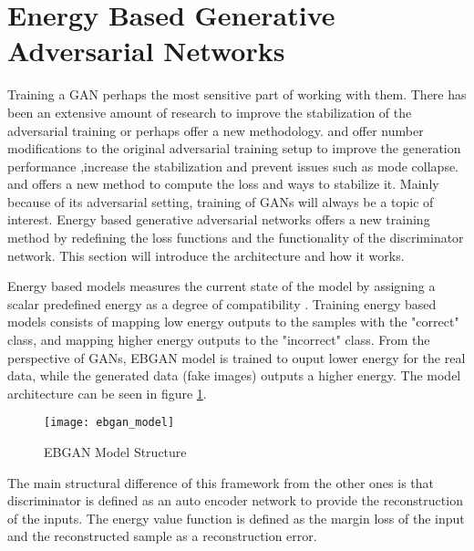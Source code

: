 \section{Energy Based Generative Adversarial Networks}
\label{sec:ebgan}

Training a GAN perhaps the most sensitive part of working with them. There has been an
extensive amount of research to improve the stabilization of the adversarial training or perhaps
offer a new methodology. \cite{fm} and \cite{methods} offer number modifications to the original
adversarial training setup to improve the generation performance ,increase the stabilization and
prevent issues such as mode collapse\footnotemark. \cite{Arjovsky2017WassersteinG} and
\cite{Gulrajani2017ImprovedTO} offers a new method to compute the loss and ways to stabilize it.
Mainly because of its adversarial setting, training of GANs will always be a topic of
interest. Energy based generative adversarial networks \cite{Zhao2016EnergybasedGA} offers a new
training method by redefining the loss functions and the functionality of the discriminator network.
This section will introduce the architecture and how it works.


Energy based models measures the current state of the model by assigning a scalar predefined energy
as a degree of compatibility \cite{LeCun06atutorial}. Training energy based models consists of
mapping low energy outputs to the samples with the "correct" class, and mapping higher energy
outputs to the "incorrect" class. From the perspective of GANs, EBGAN model is trained to ouput
lower energy for the real data, while the generated data (fake images) outputs a higher energy. The
model architecture can be seen in figure \ref{fig:ebgan_model}.

\begin{figure}[h!]
	\centering
	\texttt{[image: ebgan\_model]}
	\caption{EBGAN Model Structure \cite{Zhao2016EnergybasedGA}}
	\label{fig:ebgan_model}
\end{figure}

The main structural difference of this framework from the other ones is that discriminator is
defined as an auto encoder network to provide the reconstruction of the inputs. The energy value
function is defined as the margin loss of the input and the reconstructed sample
\cite{Zhao2016EnergybasedGA} as a reconstruction error. 


